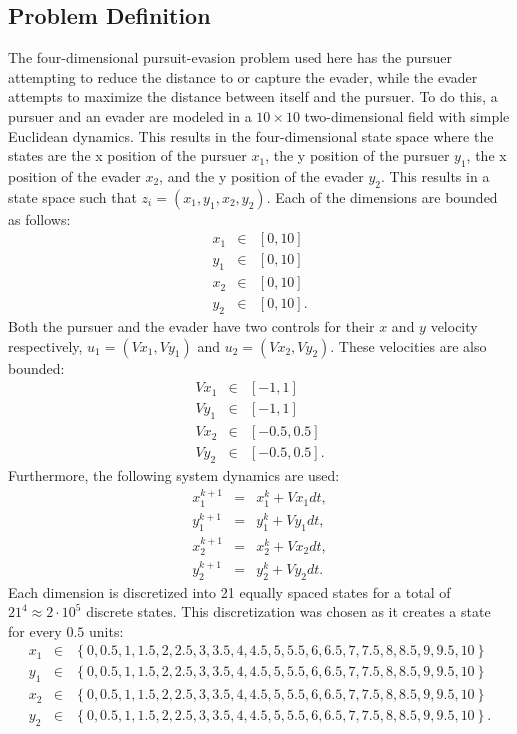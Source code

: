 \subsection{Problem Definition}
The four-dimensional pursuit-evasion problem used here has the pursuer attempting to reduce the distance to or capture the evader, while the evader attempts to maximize the distance between itself and the pursuer. To do this, a pursuer and an evader are modeled in a $10 \times 10$ two-dimensional field with simple Euclidean dynamics. This results in the four-dimensional state space where the states are the x position of the pursuer $x_1$, the y position of the pursuer $y_1$, the x position of the evader $x_2$, and the y position of the evader $y_2$. This results in a state space such that $z_i = (x_1,y_1,x_2,y_2)$. Each of the dimensions are bounded as follows:
\begin{eqnarray*}
x_1 & \in & [0,10]\\
y_1 & \in & [0,10]\\
x_2 & \in & [0,10]\\
y_2 & \in & [0,10].
\end{eqnarray*} 
Both the pursuer and the evader have two controls for their $x$ and $y$ velocity respectively, $u_1 = (Vx_1,Vy_1)$ and $u_2 = (Vx_2,Vy_2)$. These velocities are also bounded:
\begin{eqnarray*}
Vx_1 & \in & [-1,1]\\
Vy_1 & \in & [-1,1]\\
Vx_2 & \in & [-0.5,0.5]\\
Vy_2 & \in & [-0.5,0.5].
\end{eqnarray*} 
Furthermore, the following system dynamics are used:
\begin{eqnarray}
x_1^{k+1} & = & x_1^k +Vx_1dt,\label{eqns1.1} \\
y_1^{k+1} & = & y_1^k +Vy_1dt,\label{eqns1.2}\\
x_2^{k+1} & = & x_2^k +Vx_2dt,\label{eqns1.3}\\
y^{k+1}_2 & = & y_2^k +Vy_2dt.\label{eqns1.4}
\end{eqnarray}
Each dimension is discretized into 21 equally spaced states for a total of $21^4 \approx 2\cdot10^5$ discrete states. This discretization was chosen as it creates a state for every $0.5$ units:
\begin{eqnarray*}
x_1 & \in & \left\{0,0.5,1,1.5,2,2.5,3,3.5,4,4.5,5,5.5,6,6.5,7,7.5,8,8.5,9,9.5,10\right\}\\
y_1 & \in & \left\{0,0.5,1,1.5,2,2.5,3,3.5,4,4.5,5,5.5,6,6.5,7,7.5,8,8.5,9,9.5,10\right\}\\
x_2 & \in & \left\{0,0.5,1,1.5,2,2.5,3,3.5,4,4.5,5,5.5,6,6.5,7,7.5,8,8.5,9,9.5,10\right\}\\
y_2 & \in & \left\{0,0.5,1,1.5,2,2.5,3,3.5,4,4.5,5,5.5,6,6.5,7,7.5,8,8.5,9,9.5,10\right\}.
\end{eqnarray*} 
 
